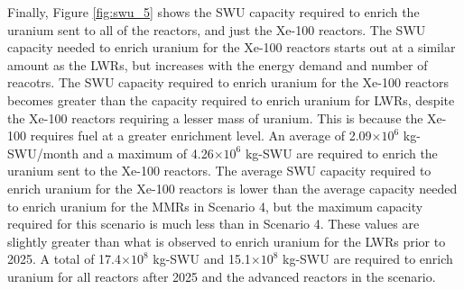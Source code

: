 Finally, Figure \ref{fig:swu_5} shows the \gls{SWU} capacity required
to enrich the uranium sent to all of the reactors, and just the Xe-100
reactors. The \gls{SWU} capacity needed 
to enrich uranium for the Xe-100 reactors starts out at a similar 
amount as the \glspl{LWR}, but 
increases with the energy demand and number of reacotrs. 
The \gls{SWU} capacity required to enrich uranium 
for the Xe-100 reactors becomes greater than the capacity 
required to enrich uranium for \glspl{LWR}, despite the Xe-100 
reactors requiring a lesser mass of uranium. This is because the 
Xe-100 requires fuel at a greater enrichment level. An average of 
2.09$\times 10^6$ kg-\gls{SWU}/month and a maximum of 
4.26$\times 10^6$ kg-\gls{SWU} are required to enrich the uranium sent 
to the Xe-100 reactors. The average \gls{SWU} capacity 
required to enrich uranium for the Xe-100 reactors is lower 
than the average capacity needed to enrich uranium for the \glspl{MMR}
in Scenario 4, but the maximum capacity required for this scenario is much 
less than in Scenario 4. These values are slightly greater 
than what is observed to enrich uranium for the \glspl{LWR}
prior to 2025. A total of 17.4$\times 10^8$ kg-SWU and 15.1$\times 10^8$
kg-SWU are required to enrich uranium for all reactors after 2025 and the advanced 
reactors in the scenario.  


